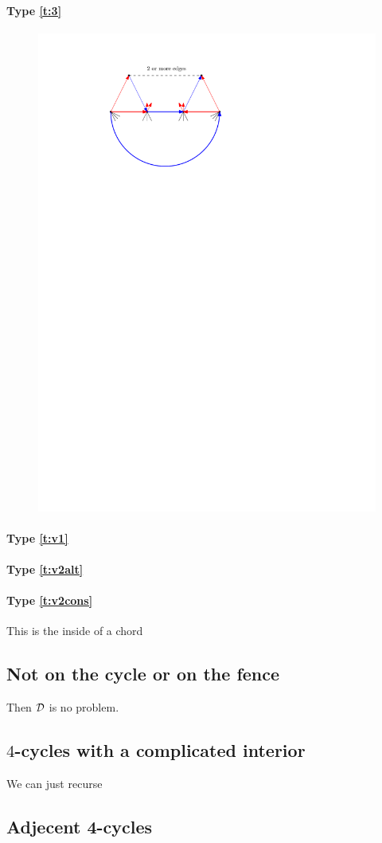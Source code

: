   \paragraph{Type \ref{t:3}}

  \begin{figure}[h]
    \centering
    \includegraphics[scale=1]{4cycles/img/fence_d}
    \caption{}
    \label{fig:4c:fence_d}
  \end{figure}


  \paragraph{Type \ref{t:v1}}

  \paragraph{Type \ref{t:v2alt}}

  \paragraph{Type \ref{t:v2cons}}
    This is the inside of a chord

\subsection{Not on the cycle or on the fence}
  Then $\mathcal{D}$ is no problem.

\subsection{$4$-cycles with a complicated interior}
  We can just recurse

\subsection{Adjecent 4-cycles}
